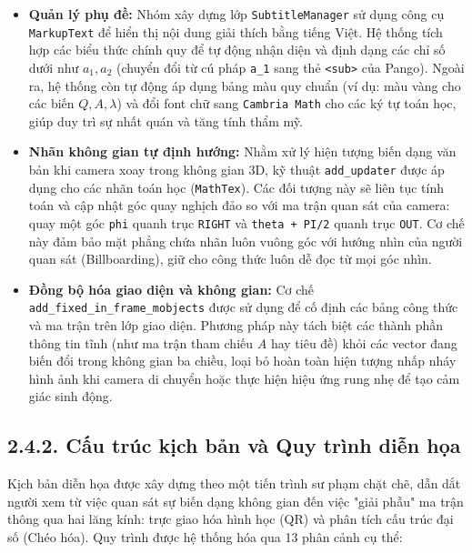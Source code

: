 \begin{itemize}
    \item \textbf{Quản lý phụ đề:} Nhóm xây dựng lớp \texttt{SubtitleManager} sử dụng công cụ \texttt{MarkupText} để hiển thị nội dung giải thích bằng tiếng Việt. Hệ thống tích hợp các biểu thức chính quy để tự động nhận diện và định dạng các chỉ số dưới như $a_1, a_2$ (chuyển đổi từ cú pháp \texttt{a\_1} sang thẻ \texttt{<sub>} của Pango). Ngoài ra, hệ thống còn tự động áp dụng bảng màu quy chuẩn (ví dụ: màu vàng cho các biến $Q, A, \lambda$) và đổi font chữ sang \texttt{Cambria Math} cho các ký tự toán học, giúp duy trì sự nhất quán và tăng tính thẩm mỹ.
    \item \textbf{Nhãn không gian tự định hướng:} Nhằm xử lý hiện tượng biến dạng văn bản khi camera xoay trong không gian 3D, kỹ thuật \texttt{add\_updater} được áp dụng cho các nhãn toán học (\texttt{MathTex}). Các đối tượng này sẽ liên tục tính toán và cập nhật góc quay nghịch đảo so với ma trận quan sát của camera: quay một góc \texttt{phi} quanh trục \texttt{RIGHT} và \texttt{theta + PI/2} quanh trục \texttt{OUT}. Cơ chế này đảm bảo mặt phẳng chứa nhãn luôn vuông góc với hướng nhìn của người quan sát (Billboarding), giữ cho công thức luôn dễ đọc từ mọi góc nhìn.
    \item \textbf{Đồng bộ hóa giao diện và không gian:} Cơ chế \texttt{add\_fixed\_in\_frame\_mobjects} được sử dụng để cố định các bảng công thức và ma trận trên lớp giao diện. Phương pháp này tách biệt các thành phần thông tin tĩnh (như ma trận tham chiếu $A$ hay tiêu đề) khỏi các vector đang biến đổi trong không gian ba chiều, loại bỏ hoàn toàn hiện tượng nhấp nháy hình ảnh khi camera di chuyển hoặc thực hiện hiệu ứng rung nhẹ để tạo cảm giác sinh động.
\end{itemize}

\subsection*{2.4.2. Cấu trúc kịch bản và Quy trình diễn họa}
{}

Kịch bản diễn họa được xây dựng theo một tiến trình sư phạm chặt chẽ, dẫn dắt người xem từ việc quan sát sự biến dạng không gian đến việc "giải phẫu" ma trận thông qua hai lăng kính: trực giao hóa hình học (QR) và phân tích cấu trúc đại số (Chéo hóa). Quy trình được hệ thống hóa qua 13 phân cảnh cụ thể:

